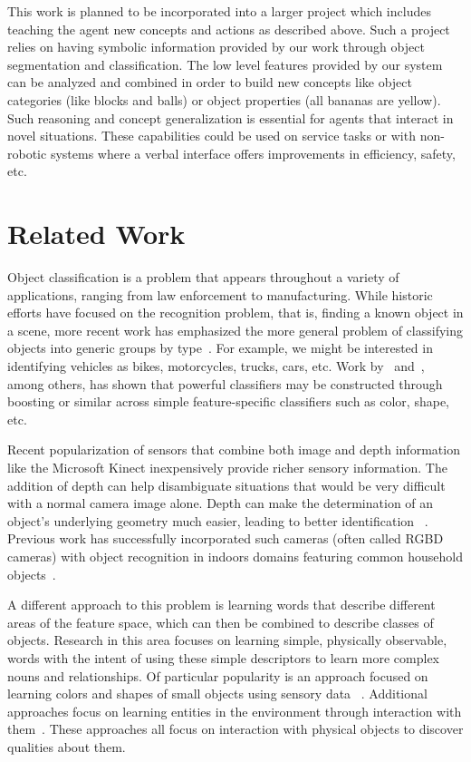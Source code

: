 \documentclass[11pt]{article}
\newcommand{\xxx}[1]{{\bf \color{red} #1}}
\begin{document}
This work is planned to be incorporated into a larger project which includes
teaching the agent new concepts and actions as described above. Such a project
relies on having symbolic information provided by our work through object
segmentation and classification. The low level features provided by our system
can be analyzed and combined in order to build new concepts like object
categories (like blocks and balls) or object properties (all bananas are yellow).
Such reasoning and concept generalization is essential for agents that interact
in novel situations. These capabilities could be used on service tasks or with
non-robotic systems where a verbal interface offers improvements in efficiency,
safety, etc.


\section{Related Work}

Object classification is a problem that appears throughout a variety of
applications, ranging from law enforcement to manufacturing. While historic
efforts have focused on the recognition problem, that is, finding a known object
in a scene, more recent work has emphasized the more general problem of
classifying objects into generic groups by type~\cite{huber2004parts}. For example,
we might be interested in identifying vehicles as bikes, motorcycles, trucks,
cars, etc. Work by~\cite{nilsback2006visual} and~\cite{gehler2009feature}, among
others, has shown that powerful classifiers may be constructed through boosting
or similar across simple feature-specific classifiers such as color, shape, etc.

Recent popularization of sensors that combine both image and depth information
like the Microsoft Kinect inexpensively provide richer sensory information. The
addition of depth can help disambiguate situations that would be very difficult
with a normal camera image alone. Depth can make the determination of an object’s
underlying geometry much easier, leading to better identification
~\cite{marton2010hierarchical}.
Previous work has successfully incorporated such cameras (often called RGBD
cameras) with object recognition in indoors domains featuring common household
objects~\cite{marton2010hierarchical, lai2011sparse}.

A different approach to this problem is learning words that describe different
areas of the feature space, which can then be combined to describe classes of
objects. Research in this area focuses on learning simple, physically observable,
words with the intent of using these simple descriptors to learn more complex
nouns and relationships. Of particular popularity is an approach focused on
learning colors and shapes of small objects using sensory data
~\cite{zambuto2010visually, roy2002learning}. Additional approaches focus on
learning entities in the environment through interaction with
them~\cite{gold2009robotic}. These approaches all focus on interaction with
physical objects to discover qualities about them.
\end{document}
